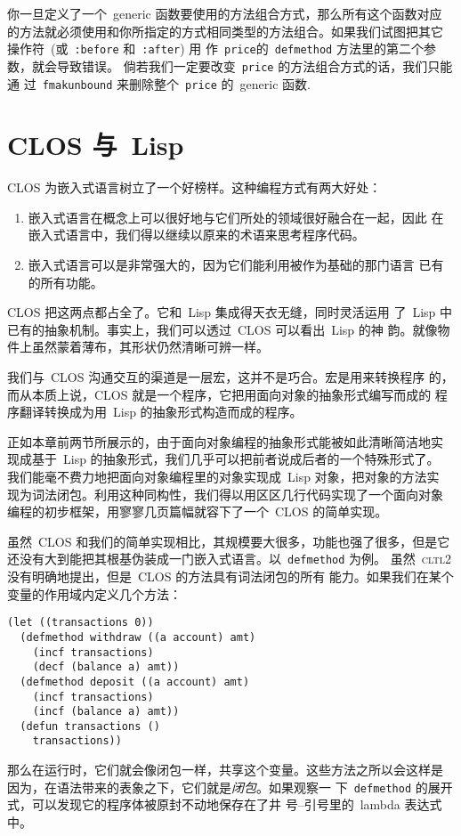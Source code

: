 你一旦定义了一个~generic 函数要使用的方法组合方式，那么所有这个函数对应
的方法就必须使用和你所指定的方式相同类型的方法组合。如果我们试图把其它
操作符~(或~\texttt{:before} 和~\texttt{:after}) 用
作~\texttt{price}的~\texttt{defmethod} 方法里的第二个参数，就会导致错误。
倘若我们一定要改变~\texttt{price} 的方法组合方式的话，我们只能通
过~\texttt{fmakunbound} 来删除整个~\texttt{price} 的~generic 函数.

\section{CLOS 与~Lisp}
\label{sec:clos_and_lisp}

CLOS 为嵌入式语言树立了一个好榜样。这种编程方式有两大好处：
\begin{enumerate}
\item 嵌入式语言在概念上可以很好地与它们所处的领域很好融合在一起，因此
  在嵌入式语言中，我们得以继续以原来的术语来思考程序代码。
\item 嵌入式语言可以是非常强大的，因为它们能利用被作为基础的那门语言
  已有的所有功能。
\end{enumerate}

CLOS 把这两点都占全了。它和~Lisp 集成得天衣无缝，同时灵活运用
了~Lisp 中已有的抽象机制。事实上，我们可以透过~CLOS 可以看出~Lisp 的神
韵。就像物件上虽然蒙着薄布，其形状仍然清晰可辨一样。

我们与~CLOS 沟通交互的渠道是一层宏，这并不是巧合。宏是用来转换程序
的，而从本质上说，CLOS 就是一个程序，它把用面向对象的抽象形式编写而成的
程序翻译转换成为用~Lisp 的抽象形式构造而成的程序。

正如本章前两节所展示的，由于面向对象编程的抽象形式能被如此清晰简洁地实
现成基于~Lisp 的抽象形式，我们几乎可以把前者说成后者的一个特殊形式了。
我们能毫不费力地把面向对象编程里的对象实现成~Lisp 对象，把对象的方法实
现为词法闭包。利用这种同构性，我们得以用区区几行代码实现了一个面向对象
编程的初步框架，用寥寥几页篇幅就容下了一个~CLOS 的简单实现。

虽然~CLOS 和我们的简单实现相比，其规模要大很多，功能也强了很多，但是它
还没有大到能把其根基伪装成一门嵌入式语言。以~\texttt{defmethod} 为例。
虽然~\textsc{cltl}2 没有明确地提出，但是~CLOS 的方法具有词法闭包的所有
能力。如果我们在某个变量的作用域内定义几个方法：
\begin{lstlisting}
(let ((transactions 0))
  (defmethod withdraw ((a account) amt)
    (incf transactions)
    (decf (balance a) amt))
  (defmethod deposit ((a account) amt)
    (incf transactions)
    (incf (balance a) amt))
  (defun transactions ()
    transactions))
\end{lstlisting}
那么在运行时，它们就会像闭包一样，共享这个变量。这些方法之所以会这样是
因为，在语法带来的表象之下，它们就是\emph{闭包}。如果观察一
下~\texttt{defmethod} 的展开式，可以发现它的程序体被原封不动地保存在了井
号--引号里的~lambda 表达式中。

